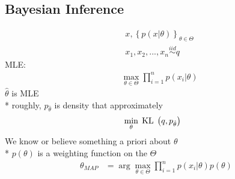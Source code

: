 \documentclass{article}
\begin{document}
\subsection{Bayesian Inference}
\begin{align*}
&x , \left\{p\left(x | \theta\right)\right\}_{\theta \in \Theta}
\\ &x_{1}, x_{2}, ..., x_{n} \stackrel{iid}{\sim} q 
\end{align*}
MLE:
\begin{align*}
&\displaystyle\max_{\theta \in \Theta} \displaystyle\prod_{i=1}^{n} p\left(x_{i} | \theta\right)
\end{align*}
$\hat{\theta}$ is MLE
\\* roughly, $p_{\hat{\theta}}$ is density that approximately
\begin{align*}
&\displaystyle\min_{\theta} \text{\;KL\;} \left(q, p_{\hat{\theta}}\right)
\end{align*}
We know or believe something a priori about $\theta$
\\* $p\left(\theta\right) $ is a weighting function on the $\Theta$
\begin{align*}
\theta_{MAP} &= \arg\displaystyle\max_{\theta \in \Theta} \displaystyle\prod_{i=1}^{n} p\left(x_{i} | \theta\right) p\left(\theta\right)
\end{align*}
\end{document}
